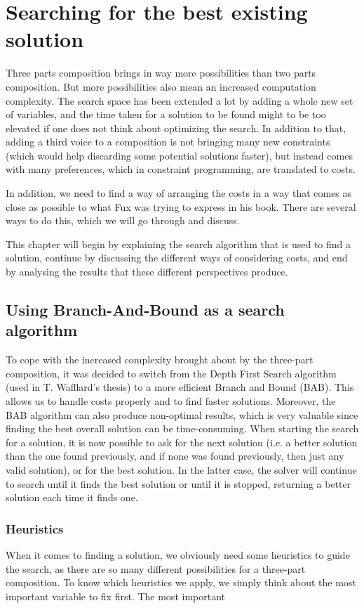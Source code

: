\chapter{Searching for the best existing solution}
Three parts composition brings in way more possibilities than two parts composition. 
But more possibilities also mean an increased computation complexity. The search space has been extended a lot by adding a whole new set of variables, and the time taken for a solution to be found might to be too elevated if one does not think about optimizing the search. In addition to that, adding a third voice to a composition is not bringing many new constraints (which would help discarding some potential solutions faster), but instead comes with many preferences, which in constraint programming, are translated to costs.

In addition, we need to find a way of arranging the costs in a way that comes as close as possible to what Fux was trying to express in his book. There are several ways to do this, which we will go through and discuss.  

This chapter will begin by explaining the search algorithm that is used to find a solution, continue by discussing the different ways of considering costs, and end by analysing the results that these different perspectives produce.

\section{Using Branch-And-Bound as a search algorithm}

To cope with the increased complexity brought about by the three-part composition, it was decided to switch from the Depth First Search algorithm (used in T. Wafflard's thesis) to a more efficient Branch and Bound (BAB). This allows us to handle costs properly and to find faster solutions. Moreover, the BAB algorithm can also produce non-optimal results, which is very valuable since finding the best overall solution can be time-consuming. When starting the search for a solution, it is now possible to ask for the next solution (i.e. a better solution than the one found previously, and if none was found previously, then just any valid solution), or for the best solution. In the latter case, the solver will continue to search until it finds the best solution or until it is stopped, returning a better solution each time it finds one.


\subsection{Heuristics}
When it comes to finding a solution, we obviously need some heuristics to guide the search, as there are so many different possibilities for a three-part composition. 
To know which heuristics we apply, we simply think about the most important variable to fix first. The most important 


